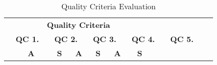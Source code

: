 \begin{table}[!htb]
  \centering
  \caption{Quality Criteria Evaluation}
  \label{tbl:gl-quality-criteria-results}
  \scriptsize
  \begin{tabular}{c|p{2cm}|cc|cc|cc|cc|cc|c}
    \hhline{~~-----------}
    \multicolumn{2}{l}{\multirow{3}{*}{~ ~ ~ ~ ~ ~}}                                & \multicolumn{11}{c}{{\cellcolor[rgb]{0.753,0.753,0.753}}\textbf{Quality Criteria ~ ~ ~ ~ ~ ~ ~ ~}}                                                                                                                                                                                                                                                                                                                                                                                                                                                                                                                                                                                                                                                                                                                                                         \\
    \hhline{~~-----------}
    \multicolumn{2}{l}{}                                                            & \multicolumn{2}{c|}{{\cellcolor[rgb]{0.753,0.753,0.753}}\textbf{QC 1. ~}}                          & \multicolumn{2}{c|}{{\cellcolor[rgb]{0.753,0.753,0.753}}\textbf{QC 2. ~}} & \multicolumn{2}{c|}{{\cellcolor[rgb]{0.753,0.753,0.753}}\textbf{QC 3. ~}} & \multicolumn{2}{c|}{{\cellcolor[rgb]{0.753,0.753,0.753}}\textbf{QC 4. ~}} & \multicolumn{2}{c|}{{\cellcolor[rgb]{0.753,0.753,0.753}}\textbf{QC 5. }} & \multicolumn{1}{l}{{\cellcolor[rgb]{0.753,0.753,0.753}}}                                                                                                                                                                                                                                                                                                                                                                               \\
    \multicolumn{2}{l}{}                                                            & {\cellcolor[rgb]{0.753,0.753,0.753}}\textbf{A} & 
    {\cellcolor[rgb]{0.753,0.753,0.753}}\textbf{S} & 
    {\cellcolor[rgb]{0.753,0.753,0.753}}\textbf{A} & 
    {\cellcolor[rgb]{0.753,0.753,0.753}}\textbf{S} & 
    {\cellcolor[rgb]{0.753,0.753,0.753}}\textbf{A} & 
    {\cellcolor[rgb]{0.753,0.753,0.753}}\textbf{S} & 

\end{tabular}
\end{table}
